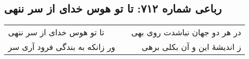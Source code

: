 \begin{center}
\section*{رباعی شماره ۷۱۲: تا تو هوس خدای از سر ننهی}
\label{sec:sh712}
\begin{longtable}{l p{0.5cm} r}
تا تو هوس خدای از سر ننهی
&&
در هر دو جهان نباشدت روی بهی
\\
ور زانکه به بندگی فرود آری سر
&&
ز اندیشهٔ این و آن بکلی برهی
\\
\end{longtable}
\end{center}
